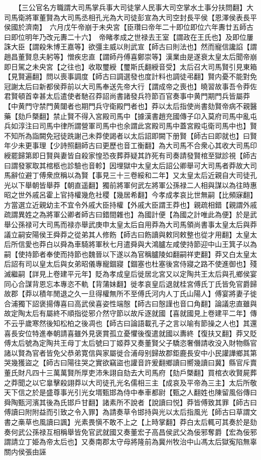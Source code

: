 　　【三公官名方職謂大司馬掌兵事大司徒掌人民事大司空掌水土事分扶問翻】大司馬衛將軍董賢為大司馬丞相孔光為大司徒彭宣為大司空封長平侯【恩澤侯表長平侯國於濟南】　六月戊午帝崩于未央宮【臣瓚曰帝年二十即位即位六年夀廿五師古曰即位明年乃改元夀二十六】　帝睹孝成之世禄去王室【謂政在王氏也】及即位屢誅大臣【謂殺朱博王嘉等】欲彊主威以則武宣【師古曰則法也】然而寵信讒諂【謂趙昌董賢息夫躬等】憎疾忠直【謂師丹傅喜鄭崇等】漢業由是遂衰太皇太后聞帝崩即日駕之未央宮【之往也】收取璽綬【璽斯氏翻綬音受】太后召大司馬賢引見東箱【見賢遍翻】問以喪事調度【師古曰調選發也度計料也調徒弔翻】賢内憂不能對免冠謝太后曰新都侯莽前以大司馬奉送先帝大行【謂成帝之喪也】曉習故事吾令莽佐君賢頓首幸甚太后遣使者馳召莽詔尚書諸發兵符節百官奏事中黄門期門兵皆屬莽【中黄門守禁門黄闥者也期門兵守衛殿門者也】莽以太后指使尚書劾賢帝病不親醫藥【劾戶槩翻】禁止賢不得入宮殿司馬中【據漢書趙充國傳子卬入莫府司馬中亂屯兵如淳注曰司馬中律所謂營軍司馬中也余謂此宮殿司馬中蓋宮殿屯衛司馬中也】賢不知所為詣闕免冠徒跣謝己未莽使謁者以太后詔即闕下册賢【師古曰即就也】曰賢年少未更事理【少詩照翻師古曰更歷也音工衡翻】為大司馬不合衆心其收大司馬印綬罷歸第即日賢與妻皆自殺家惶恐夜葬莽疑其詐死有司奏請發賢棺至獄診視【師古曰謂發冢取其棺柩也診驗也音軫】因埋獄中太皇太后詔公卿舉可大司馬者莽故大司馬辭位避丁傅衆庶稱以為賢【事見三十三卷綏和二年】又太皇太后近親自大司徒孔光以下舉朝皆舉莽【朝直遥翻】獨前將軍何武左將軍公孫禄二人相與謀以為往時惠昭之世外戚呂霍上官持權幾危社稷【幾居希翻】今孝成孝哀比世無嗣【比頻寐翻】方當選立近親幼主不宜令外戚大臣持權【外戚大臣謂王莽也】親疏相錯【親謂外戚疏謂異姓之為將軍公卿者師古曰錯間雜也】為國計便【為國之計唯此為便】於是武舉公孫禄可大司馬而禄亦舉武庚申太皇太后自用莽為大司馬領尚書事太皇太后與莽議立嗣安陽侯王舜莽之從弟其人修飭【師古曰飭讀與敕同敕整也從才用翻】太皇太后所信愛也莽白以舜為車騎將軍秋七月遣舜與大鴻臚左咸使持節迎中山王箕子以為嗣【使持節者奉使而持節也魏晉以下遂以為官稱臚陵如翻嗣祥吏翻】莽又白太皇太后詔有司以皇太后與女弟昭儀專寵錮寢【錮塞也杜塞後宮侍寢之路不使進御也】殘滅繼嗣【詳見上卷建平元年】貶為孝成皇后徙居北宮又以定陶共王太后與孔鄉侯宴同心合謀背恩忘本專恣不軌【背蒲妹翻】徙孝哀皇后退就桂宮傅氏丁氏皆免官爵歸故郡【莽以積年閒退之久一旦得權無所不至傅氏河内人丁氏山陽人】傅宴將妻子徙合浦獨下詔褒揚傳喜曰高武侯喜姿性端慤【師古曰慤謹也音口角翻】論議忠直雖與故定陶太后有屬終不順指從邪介然守節以故斥逐就國【喜就國見上卷建平二年】傳不云乎歲寒然後知松柏之後凋也【師古曰論語載孔子之言以喻有節操之人也】其還喜長安位特進奉朝請喜雖外見褒賞孤立憂懼後復遣就國以夀終【復扶又翻】莽又貶傅太后號為定陶共王母丁太后號曰丁姬莽又奏董賢父子驕恣奢僭請收没入財物縣官諸以賢為官者皆免父恭弟寛信與家屬徙合浦母别歸故郡鉅鹿長安中小民讙譁鄉其第哭幾獲盜之【師古曰陽往哭之實欲竊盜也讙音許爰翻鄉讀曰嚮幾讀曰冀】縣官斥賣董氏財凡四十三萬萬賢所厚吏沛朱詡自劾去大司馬府【劾戶槩翻】買棺衣收賢屍葬之莽聞之以它辠擊殺詡莽以大司徒孔光名儒相三主【成哀及平帝為三主】太后所敬天下信之於是盛尊事光引光女壻甄邯為侍中奉車都尉【甄之人翻姓也陳留風俗傳曰舜陶甄河濱其後為氏邯戶甘翻】諸素所不說者【說讀曰悦】莽皆傅致其罪【師古曰傅讀曰附附益而引致之令入罪】為請奏草令邯持與光以太后指風光【師古曰草謂文書之槀草也風讀曰諷】光素畏愼不敢不上之【上時掌翻】莽白太后輒可其奏於是劾奏何武公孫禄互相稱舉皆免官武就國又奏董宏子高昌侯武父為佞邪奪爵【宏為佞邪謂請立丁姫為帝太后也】又奏南郡太守母將隆前為冀州牧治中山馮太后獄寃陷無辜關内侯張由誣